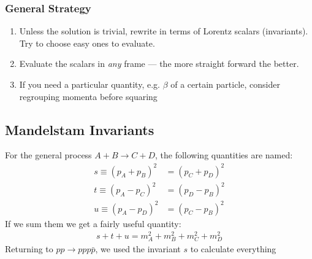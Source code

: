 \subsubsection{General Strategy}
\begin{enumerate}
\item Unless the solution is trivial, rewrite in terms of Lorentz scalars (invariants). Try to choose easy ones to evaluate.
\item Evaluate the scalars in \emph{any} frame --- the more straight forward the better.
\item If you need a particular quantity, e.g. $\beta$ of a certain particle, consider regrouping momenta before squaring
\end{enumerate}

\subsection{Mandelstam Invariants}
For the general process $A+B\to C+D$, the following quantities are named:
\begin{align*}
  s\equiv(p_A+p_B)^2&=(p_C+p_D)^2\\
  t\equiv(p_A-p_C)^2&=(p_D-p_B)^2\\
  u\equiv(p_A-p_D)^2&=(p_C-p_B)^2
\end{align*}
If we sum them we get a fairly useful quantity:
\begin{align*}
  s+t+u=m_A^2+m_B^2+m_C^2+m_D^2
\end{align*}
Returning to $pp\to ppp\bar{p}$, we used the invariant $s$ to calculate everything
